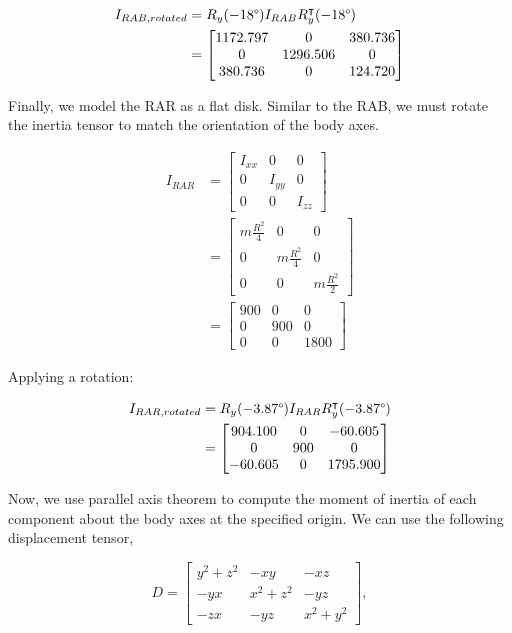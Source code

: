 \begin{align*}
I_{RAB,rotated} &= R_{y}(-18\degree) I_{RAB} R_{y}^{\intercal}(-18\degree) \\
&=
\begin{bmatrix}
1172.797 & 0 & 380.736 \\
0 & 1296.506 & 0 \\
380.736 & 0 & 124.720
\end{bmatrix}
\end{align*}

Finally, we model the RAR as a flat disk. Similar to the RAB, we must rotate the inertia tensor to match the orientation of the body axes.

\begin{align*}
I_{RAR} &=
\begin{bmatrix}
I_{xx} & 0 & 0 \\
0 & I_{yy} & 0 \\
0 & 0 & I_{zz}
\end{bmatrix} \\
&=
\begin{bmatrix}
m \frac{R^{2}}{4} & 0 & 0 \\
0 & m \frac{R^{2}}{4} & 0 \\
0 & 0 & m \frac{R^{2}}{2} 
\end{bmatrix} \\
&=
\begin{bmatrix}
900 & 0 & 0 \\
0 & 900 & 0 \\
0 & 0 & 1800 
\end{bmatrix}
\end{align*}

Applying a rotation:

\begin{align*}
I_{RAR,rotated} &= R_{y}(-3.87\degree) I_{RAR} R_{y}^{\intercal}(-3.87\degree) \\
&=
\begin{bmatrix}
904.100 & 0 & -60.605 \\
0 & 900 & 0 \\
-60.605 & 0 & 1795.900
\end{bmatrix}
\end{align*}

Now, we use parallel axis theorem to compute the moment of inertia of each component about the body axes at the specified origin. We can use the following displacement tensor,

\begin{equation*}
D =
\begin{bmatrix}
y^{2} + z^{2} & -xy & -xz \\
-yx & x^{2} + z^{2} & -yz \\
-zx & -yz & x^{2} + y^{2}
\end{bmatrix},
\end{equation*}


